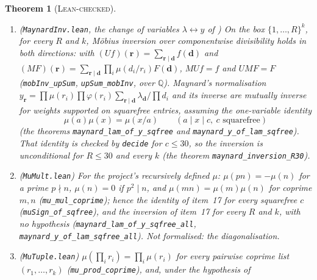 \documentclass[11pt]{amsart}
\newtheorem{theorem}{Theorem}
\theoremstyle{definition}
\theoremstyle{remark}
\newcommand{\lbl}[1]{\textup{\textsc{#1}}}
\begin{document}
\begin{theorem}[\lbl{Lean-checked}]
\begin{enumerate}
\[=\sum_{\mathbf d,\mathbf e\in D_k}\lambda_{\mathbf d}\lambda_{\mathbf e}\,
\#\left\{n<N:\ n\equiv v_0\ (W),\ [d_i,e_i]\mid n+h_i\ \forall i\right\};
\]
and, if all entries are coprime to $W$ and for every pair the
moduli $[d_i,e_i]$ are pairwise coprime, the error bound
\[
\left|S_1-\frac NW\sum_{\mathbf d,\mathbf e}\frac{\lambda_{\mathbf d}\lambda_{\mathbf e}}{\prod_i[d_i,e_i]}\right|\le\sum_{\mathbf d,\mathbf e}|\lambda_{\mathbf d}\lambda_{\mathbf e}|
\]
in division-free form (\texttt{maynard\_S1\_error}, through a Chinese remainder step for $k$ moduli).
Not formalised: the change of variables to $y_{\mathbf r}$, the diagonalisation, the asymptotic main
term, and the pairs with non-coprime moduli (assumed away, where Maynard shows they do not occur).
\item (\texttt{MaynardInv.lean}, the change of variables $\lambda\leftrightarrow y$ of
\cite[Lemma~5.1]{May15}) On the box $\{1,\dots,R\}^k$, for every $R$ and $k$, M\"obius inversion over
componentwise divisibility holds in both directions: with $(Uf)(\mathbf r)=\sum_{\mathbf r\mid\mathbf d}f(\mathbf d)$
and $(MF)(\mathbf r)=\sum_{\mathbf r\mid\mathbf d}\prod_i\mu(d_i/r_i)F(\mathbf d)$, $MUf=f$ and $UMF=F$
(\texttt{mobInv\_upSum}, \texttt{upSum\_mobInv}, over $\mathbb Q$). Maynard's normalisation
$y_{\mathbf r}=\prod\mu(r_i)\prod\varphi(r_i)\sum_{\mathbf r\mid\mathbf d}\lambda_{\mathbf d}/\prod d_i$
and its inverse are mutually inverse for weights supported on squarefree entries, assuming the one-variable
identity
\[\mu(a)\mu(x)=\mu(x/a)\qquad(a\mid x\mid c,\ c\text{ squarefree})\] (the theorems \texttt{maynard\_lam\_of\_y\_sqfree} and \texttt{maynard\_y\_of\_lam\_sqfree}).
That identity is checked by \texttt{decide} for $c\le30$, so the inversion is unconditional for $R\le30$
and every $k$ (the theorem \texttt{maynard\_inversion\_R30}).
\item (\texttt{MuMult.lean}) For the project's recursively defined $\mu$: $\mu(pn)=-\mu(n)$ for a
prime $p\nmid n$, $\mu(n)=0$ if $p^2\mid n$, and $\mu(mn)=\mu(m)\mu(n)$ for coprime $m,n$
(\texttt{mu\_mul\_coprime}); hence the identity of item~17 for every squarefree $c$
(\texttt{muSign\_of\_sqfree}), and the inversion of item~17 for every $R$ and $k$, with no hypothesis
(\texttt{maynard\_lam\_of\_y\_sqfree\_all}, \texttt{maynard\_y\_of\_lam\_sqfree\_all}). Not formalised:
the diagonalisation.
\item (\texttt{MuTuple.lean}) $\mu(\prod_i r_i)=\prod_i\mu(r_i)$ for every pairwise coprime list
$(r_1,\dots,r_k)$ (\texttt{mu\_}\allowbreak\texttt{prod\_coprime}), and, under the hypothesis of

\end{enumerate}
\end{theorem}
\end{document}
